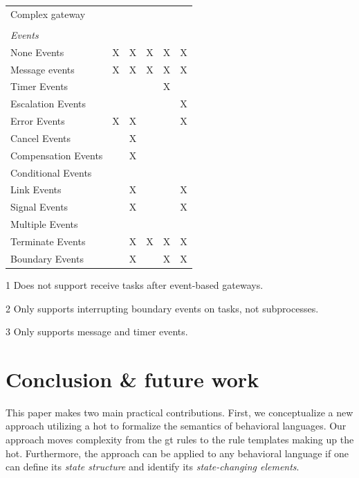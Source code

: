 \documentclass{lmcs} %
\theoremstyle{plain}\newtheorem{satz}[thm]{Satz} %
\begin{document}
\begin{table}[htbp]
\begin{threeparttable}
\begin{tabular}{l l l l l l}
      Complex gateway & & & & &\\
      \\
      \textit{Events} \\
      None Events & X & X & X & X & X\\
      Message events & X & X & X & X & X\\
      Timer Events & & & & X & \\
      Escalation Events & & & & & X\\
      Error Events & X & X & & & X\\
      Cancel Events & & X & & &\\
      Compensation Events & & X & & &\\
      Conditional Events & & & & &\\
      Link Events & & X & & & X\\
      Signal Events & & X & & & X\\
      Multiple Events & &  & & & \\
      Terminate Events & & X & X & X & X\\
      Boundary Events & & X\tnote{2} & & X\tnote{3} & X\\ %
    \end{tabular}
    \begin{tablenotes}
        \item[1] Does not support receive tasks after event-based gateways.
        \item[2] Only supports interrupting boundary events on tasks, not subprocesses.
        \item[3] Only supports message and timer events.
    \end{tablenotes}
    \end{threeparttable}
\end{table}


\section{Conclusion \& future work} \label{sec:conclusion}
This paper makes two main practical contributions.
First, we conceptualize a new approach utilizing a \gls*{hot} to formalize the semantics of behavioral languages.
Our approach moves complexity from the \gls*{gt} rules to the rule templates making up the \gls*{hot}.
Furthermore, the approach can be applied to any behavioral language if one can define its \textit{state structure} and identify its \textit{state-changing elements}.
\end{document}
